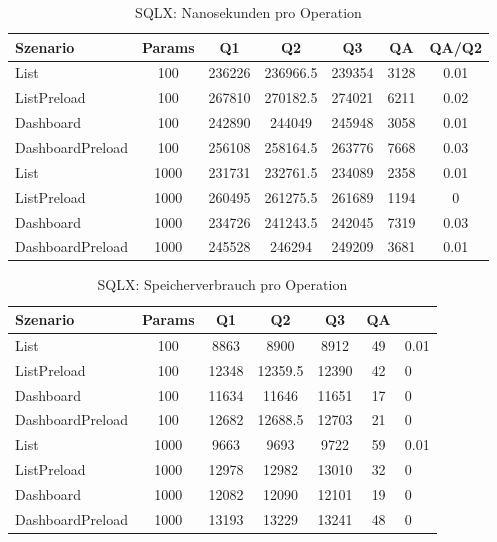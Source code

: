 
\begin{table}[ht]
\centering
\caption{SQLX: Nanosekunden pro Operation}
\begin{tabular}{lcccccc}
\toprule
Szenario & Params & Q1 & Q2 & Q3 & QA & QA/Q2 \\
\midrule
	List & 100 & 236226 & 236966.5 & 239354 & 3128 & 0.01 \\
	ListPreload & 100 & 267810 & 270182.5 & 274021 & 6211 & 0.02 \\
	Dashboard & 100 & 242890 & 244049 & 245948 & 3058 & 0.01 \\
	DashboardPreload & 100 & 256108 & 258164.5 & 263776 & 7668 & 0.03 \\
	List & 1000 & 231731 & 232761.5 & 234089 & 2358 & 0.01 \\
	ListPreload & 1000 & 260495 & 261275.5 & 261689 & 1194 & 0 \\
	Dashboard & 1000 & 234726 & 241243.5 & 242045 & 7319 & 0.03 \\
	DashboardPreload & 1000 & 245528 & 246294 & 249209 & 3681 & 0.01 \\
\bottomrule
\end{tabular}
\label{tab:benchmark_sqlx_nsperop}
\end{table}
	
\begin{table}[ht]
\centering
\caption{SQLX: Speicherverbrauch pro Operation}
\begin{tabular}{lccccc}
\toprule
Szenario & Params & Q1 & Q2 & Q3 & QA \\
\midrule
	List & 100 & 8863 & 8900 & 8912 & 49 & 0.01 \\
	ListPreload & 100 & 12348 & 12359.5 & 12390 & 42 & 0 \\
	Dashboard & 100 & 11634 & 11646 & 11651 & 17 & 0 \\
	DashboardPreload & 100 & 12682 & 12688.5 & 12703 & 21 & 0 \\
	List & 1000 & 9663 & 9693 & 9722 & 59 & 0.01 \\
	ListPreload & 1000 & 12978 & 12982 & 13010 & 32 & 0 \\
	Dashboard & 1000 & 12082 & 12090 & 12101 & 19 & 0 \\
	DashboardPreload & 1000 & 13193 & 13229 & 13241 & 48 & 0 \\
\bottomrule
\end{tabular}
\label{tab:benchmark_sqlx_bytesperop}
\end{table}
	
